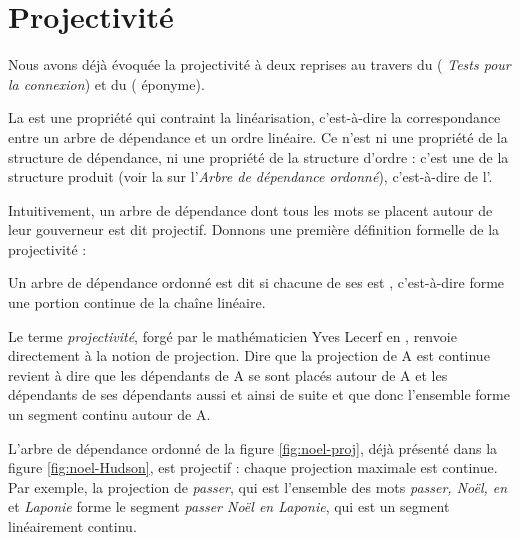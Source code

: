 \section{Projectivité}\label{sec:3.5.14}

Nous avons déjà évoquée la projectivité à deux reprises au travers du  ( \textit{Tests pour la connexion}) et du  ( éponyme).

La  est une propriété qui contraint la linéarisation, c’est-à-dire la correspondance entre un arbre de dépendance et un ordre linéaire. Ce n’est ni une propriété de la structure de dépendance, ni une propriété de la structure d’ordre : c’est une  de la structure produit (voir la  sur l'\textit{Arbre de dépendance ordonné}), c’est-à-dire de l'.


Intuitivement, un arbre de dépendance dont tous les mots se placent autour de leur gouverneur est dit projectif. Donnons une première définition formelle de la projectivité :

{Un arbre de dépendance ordonné est dit  si chacune de ses  est , c’est-à-dire forme une portion continue de la chaîne linéaire.}

Le terme \textit{projectivité}, forgé par le mathématicien Yves Lecerf en \citeyear{lecerf1960programme}, renvoie directement à la notion de projection. Dire que la projection de A est continue revient à dire que les dépendants de A se sont placés autour de A et les dépendants de ses dépendants aussi et ainsi de suite et que donc l’ensemble forme un segment continu autour de A.

L’arbre de dépendance ordonné de la figure \ref{fig:noel-proj}, déjà présenté dans la figure \ref{fig:noel-Hudson}, est projectif : chaque projection maximale est continue. Par exemple, la projection de \textit{passer}, qui est l’ensemble des mots \textit{passer, Noël, en} et \textit{Laponie} forme le segment \textit{passer Noël en Laponie}, qui est un segment linéairement continu.

